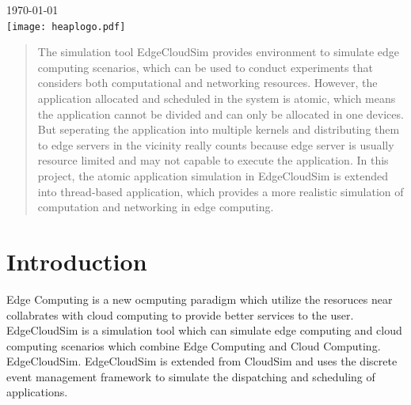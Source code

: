 \begin{titlepage}

{\large \today}\\[2cm] %


\texttt{[image: heaplogo.pdf]}\\[1cm] %
 

\vfill %

\end{titlepage}




\begin{abstract}
The simulation tool EdgeCloudSim provides environment to simulate edge computing scenarios, which can be used to conduct experiments that considers both computational and networking resources. However, the application allocated and scheduled in the system is atomic, which means the application cannot be divided and can only be allocated in one devices. But seperating the application into multiple kernels and distributing them to edge servers in the vicinity really counts because edge server is usually resource limited and may not capable to execute the application. In this project, the atomic application simulation in EdgeCloudSim is extended into thread-based application, which provides a more realistic simulation of computation and networking in edge computing.
\end{abstract}

\section{Introduction}

Edge Computing is a new ocmputing paradigm which utilize the resoruces near collabrates with cloud computing to provide better services to the user. EdgeCloudSim is a simulation tool which can simulate edge computing and cloud computing scenarios which combine Edge Computing and Cloud Computing. EdgeCloudSim. EdgeCloudSim is extended from CloudSim and uses the discrete event management framework to simulate the dispatching and scheduling of applications. 

